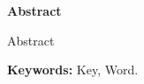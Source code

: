 {}

\begin{center}
    \textbf{\large Abstract}
\end{center}

Abstract

\vfill
\textbf{Keywords:} Key, Word.
